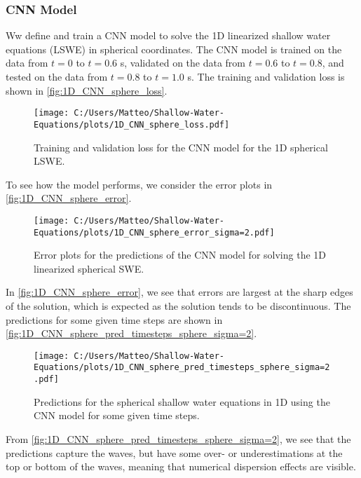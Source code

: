 \subsubsection*{CNN Model}
Ww define and train a CNN model to solve the 1D linearized shallow water equations (LSWE) in spherical coordinates.
The CNN model is trained on the data from $t = 0$ to $t = 0.6$ s, validated on the data from $t = 0.6$ to $t = 0.8$, and tested on the data from $t = 0.8$ to $t = 1.0$ s.
The training and validation loss is shown in \autoref{fig:1D_CNN_sphere_loss}.
\begin{figure}[H]
    \centering
    \texttt{[image: C:/Users/Matteo/Shallow-Water-Equations/plots/1D\_CNN\_sphere\_loss.pdf]}
    \caption{Training and validation loss for the CNN model for the 1D spherical LSWE.}\label{fig:1D_CNN_sphere_loss}
\end{figure}
To see how the model performs, we consider the error plots in \autoref{fig:1D_CNN_sphere_error}.
\begin{figure}[H]
    \centering
    \texttt{[image: C:/Users/Matteo/Shallow-Water-Equations/plots/1D\_CNN\_sphere\_error\_sigma=2.pdf]}
    \caption{Error plots for the predictions of the CNN model for solving the 1D linearized spherical SWE.}\label{fig:1D_CNN_sphere_error}
\end{figure}
In \autoref{fig:1D_CNN_sphere_error}, we see that errors are largest at the sharp edges of the solution, which is expected as the solution tends to be discontinuous.
The predictions for some given time steps are shown in \autoref{fig:1D_CNN_sphere_pred_timesteps_sphere_sigma=2}.
\begin{figure}[H]
    \centering
    \texttt{[image: C:/Users/Matteo/Shallow-Water-Equations/plots/1D\_CNN\_sphere\_pred\_timesteps\_sphere\_sigma=2.pdf]}
    \caption{Predictions for the spherical shallow water equations in 1D using the CNN model for some given time steps.}\label{fig:1D_CNN_sphere_pred_timesteps_sphere_sigma=2}
\end{figure}
From \autoref{fig:1D_CNN_sphere_pred_timesteps_sphere_sigma=2}, we see that the predictions capture the waves, but have some over- or underestimations at the top or bottom of the waves, meaning that numerical dispersion effects are visible.



